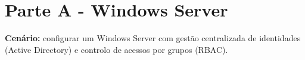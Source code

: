 
\chapter[Parte A - Windows Server]{Parte A - Windows Server}

\textbf{Cenário:} configurar um Windows Server com gestão centralizada de identidades (Active Directory) e controlo de acessos por grupos (RBAC).
